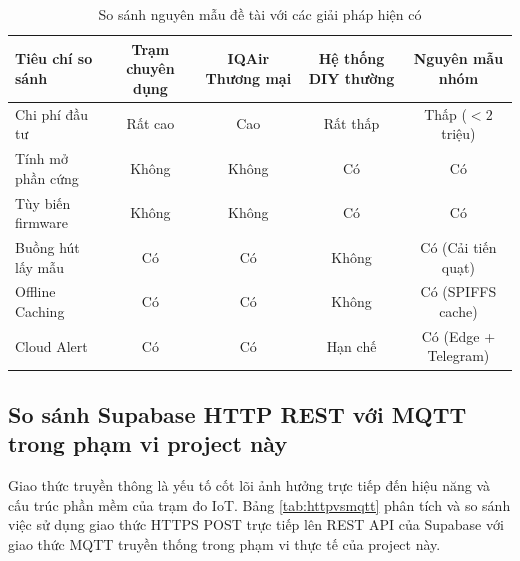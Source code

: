 \begin{table}[H]
\centering
\caption{So sánh nguyên mẫu đề tài với các giải pháp hiện có}
\label{tab:existingsolutions}
\begin{small}
\begin{tabular}{lcccc}
\toprule
\textbf{Tiêu chí so sánh} & \textbf{Trạm chuyên dụng} & \textbf{IQAir Thương mại} & \textbf{Hệ thống DIY thường} & \textbf{Nguyên mẫu nhóm} \\
\midrule
Chi phí đầu tư & Rất cao & Cao & Rất thấp & Thấp ($< 2$ triệu) \\
Tính mở phần cứng & Không & Không & Có & Có \\
Tùy biến firmware & Không & Không & Có & Có \\
Buồng hút lấy mẫu & Có & Có & Không & Có (Cải tiến quạt) \\
Offline Caching & Có & Có & Không & Có (SPIFFS cache) \\
Cloud Alert & Có & Có & Hạn chế & Có (Edge + Telegram) \\
\bottomrule
\end{tabular}
\end{small}
\end{table}

\subsection{So sánh Supabase HTTP REST với MQTT trong phạm vi project này}
Giao thức truyền thông là yếu tố cốt lõi ảnh hưởng trực tiếp đến hiệu năng và cấu trúc phần mềm của trạm đo IoT. Bảng \ref{tab:httpvsmqtt} phân tích và so sánh việc sử dụng giao thức HTTPS POST trực tiếp lên REST API của Supabase với giao thức MQTT truyền thống trong phạm vi thực tế của project này.

